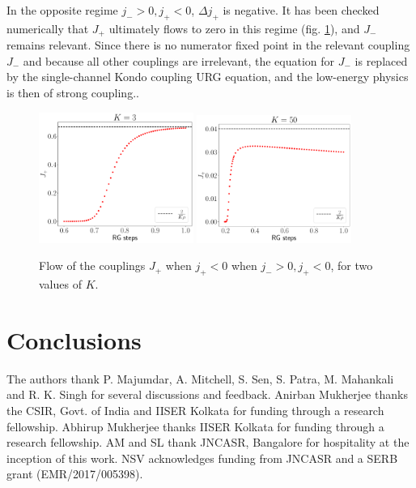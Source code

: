 \documentclass[reprint,prb,superscriptaddress]{revtex4-2}
\begin{document}
In the opposite regime \(j_- > 0, j_+ < 0\), \(\Delta j_+\) is negative. It has been checked numerically that \(J_+\) ultimately flows to zero in this regime (fig. \ref{irrel_Jplus}), and \(J_-\) remains relevant. Since there is no numerator fixed point in the relevant coupling \(J_-\) and because all other couplings are irrelevant, the equation for \(J_-\) is replaced by the single-channel Kondo coupling URG equation, and the low-energy physics is then of strong coupling..
\begin{figure}[htpb]
	\centering
	\includegraphics[width=0.45\textwidth]{../numerics/irr_Jp_K=3.pdf}
	\includegraphics[width=0.45\textwidth]{../numerics/irr_Jp_K=50.pdf}
	\caption{Flow of the couplings \(J_+\) when \(j_+ < 0\) when \(j_- > 0, j_+ < 0\), for two values of \(K\).}
	\label{irrel_Jplus}
\end{figure}

\section{Conclusions}


\acknowledgments
The authors thank P. Majumdar, A. Mitchell, S. Sen, S. Patra, M. Mahankali and R. K. Singh for several discussions and feedback. Anirban Mukherjee thanks the CSIR, Govt. of India and IISER Kolkata for funding through a research fellowship. Abhirup Mukherjee thanks IISER Kolkata for funding through a research fellowship. AM and SL thank JNCASR, Bangalore for hospitality at the inception of this work. NSV acknowledges funding from JNCASR and a SERB grant (EMR/2017/005398).
\end{document}
